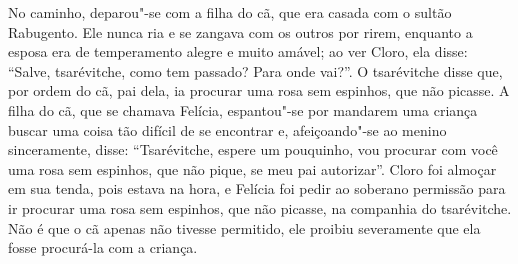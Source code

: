 No caminho, deparou"-se com a filha do cã, que era casada com o sultão
Rabugento. Ele nunca ria e se zangava com os outros por rirem, enquanto
a esposa era de temperamento alegre e muito amável; ao ver Cloro, ela
disse: ``Salve, tsarévitche, como tem passado? Para onde vai?''. O
tsarévitche disse que, por ordem do cã, pai dela, ia procurar uma rosa
sem espinhos, que não picasse. A filha do cã, que se chamava Felícia,
espantou"-se por mandarem uma criança buscar uma coisa tão difícil de se
encontrar e, afeiçoando"-se ao menino sinceramente, disse: ``Tsarévitche,
espere um pouquinho, vou procurar com você uma rosa sem espinhos, que
não pique, se meu pai autorizar''. Cloro foi almoçar em sua tenda, pois
estava na hora, e Felícia foi pedir ao soberano permissão para ir
procurar uma rosa sem espinhos, que não picasse, na companhia do
tsarévitche. Não é que o cã apenas não tivesse permitido, ele proibiu
severamente que ela fosse procurá-la com a criança.

